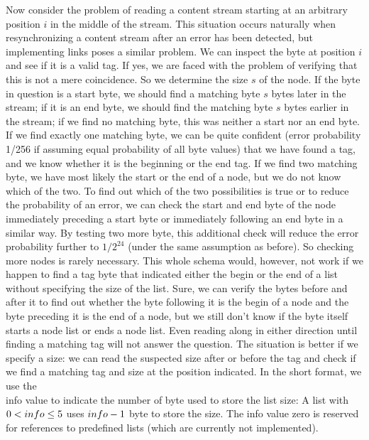 Now consider the problem of reading a content stream starting at an arbitrary
position $i$ in the middle of the stream. This situation occurs
naturally when resynchronizing a content stream after
an error has been detected, but implementing links poses a similar problem.
We can inspect the byte at position $i$ and see
if it is a valid tag. If yes, we are faced with the problem of
verifying that this is not a mere coincidence.
So we determine the size $s$ of the node. If the byte in question is a start byte,
we should find a matching byte $s$ bytes later in the stream; if it is an end byte,
we should find the matching byte $s$ bytes earlier in the stream; if we
find no matching byte, this was neither a start nor an end byte.
If we find exactly one matching byte, we can be quite confident (error
probability 1/256 if assuming equal probability of all byte values)
that we have found a tag, and we know whether
it is the beginning or the end tag. If we find two matching byte, we
have most likely the start or the end of a node, but we do not know which
of the two. To find out which of the two possibilities is true
or to reduce the probability of an error, we can
check the start and end byte of the node immediately preceding a start byte or
immediately following an end byte in a similar way.
By testing two more byte, this additional check will reduce the error
probability further to $1/2^{24}$ (under the same assumption as before). So
checking more nodes is rarely necessary.  This whole schema
would, however, not work if we happen to find a tag byte that indicated
either the begin or the end of a list without specifying the size
of the list. Sure, we can verify the bytes before and after it to
find out whether the byte following it is the begin of a node and the
byte preceding it is the end of a node, but we still don't know if the
byte itself starts a node list or ends a node list. Even reading along
in either direction until finding a matching tag will not answer the
question. The situation is better if we specify a
size: we can read the suspected size after or before the tag and check if we
find a matching tag and size at the position indicated.
In the short format, we use the \\{info} value to indicate the number of
byte used to store the list size: A list with $0<\index{info+\\{info}}\\{info}\le 5$
uses $\index{info+\\{info}}\\{info}-1$ byte to store the size.
The info value zero is reserved for references to predefined lists
(which are currently not implemented).

